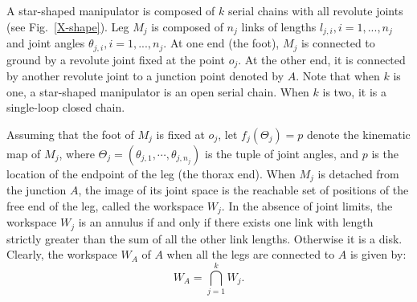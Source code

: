  \label{section-1}
A star-shaped manipulator is composed of $k$ serial chains with
all revolute joints (see Fig.~\ref{X-shape}).  Leg $M_j$ is
composed of $n_j$ links of lengths $l_{j,i}, i=1,...,n_j$
and joint angles $\theta_{j,i}, i=1,...,n_j$. At one end (the
foot), $M_j$ is connected to ground by a revolute joint fixed at
the point $o_j$. At the other end, it is connected by another
revolute joint to a junction point denoted by $A$. Note that when
$k$ is one, a star-shaped manipulator is an open serial chain.
When $k$ is two, it is a single-loop closed chain.

Assuming that the foot of $M_j$ is fixed at $o_j$, let
$f_j(\Theta_j)=p$ denote the kinematic map of $M_j$, where
$\Theta_j = (\theta_{j,1}, \cdots, \theta_{j,n_j})$ is the tuple
of joint angles, and $p$ is the location of the endpoint of the
leg (the thorax end). When $M_j$ is detached from the junction
$A$, the image of its joint space is the reachable set of
positions of the free end of the leg, called the workspace $W_j$.
In the absence of joint limits, the workspace $W_j$ is an annulus
if and only if there exists one link with length strictly greater
than the sum of all the other link lengths. Otherwise it is a
disk. Clearly, the workspace $W_A$ of $A$ when all the legs are
connected to $A$ is given by:
\begin{equation}
\label{eq:defW}
   W_A = \bigcap_{j=1}^k W_j.
\end{equation}

